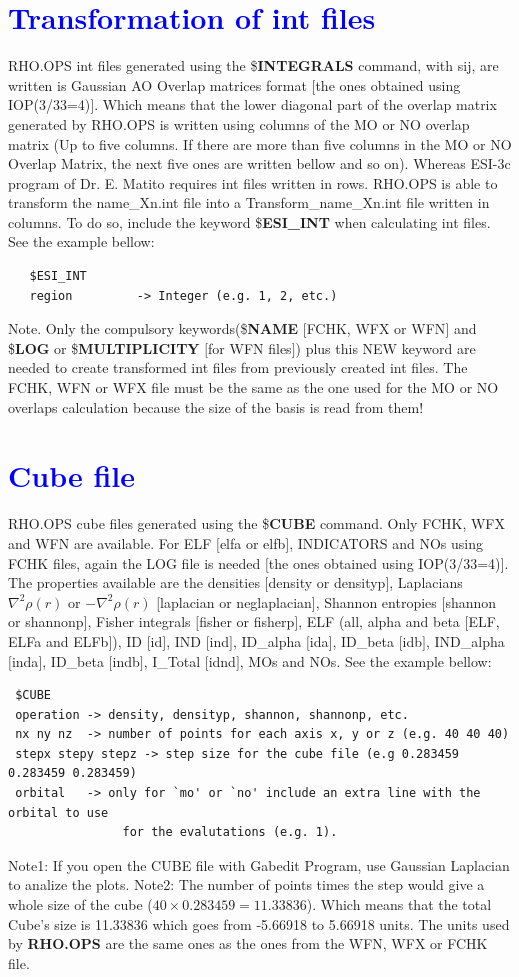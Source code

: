 \documentclass[10pt,a4paper]{article}
\newcommand{\tbl}[1]{{\textcolor{blue}{#1}}}
\begin{document}
{\section{\tbl{\textbf{Transformation of int files}}}
\noindent RHO.OPS int files generated using the \$\textbf{INTEGRALS} command, with sij, are written is Gaussian AO Overlap matrices format $[$the ones obtained using  IOP(3/33=4)$]$. Which means that the lower diagonal part of the overlap matrix generated by RHO.OPS is written using columns of the MO or NO overlap matrix (Up to five columns. If there are more than five columns in the MO or NO Overlap Matrix, the next five ones are written bellow and so on). Whereas ESI-3c program of Dr. E. Matito requires int files written in rows. RHO.OPS is able to transform the name\_Xn.int file into a Transform\_name\_Xn.int file written in columns. To do so, include the keyword \$\textbf{ESI\_INT} when calculating int files. See the example bellow:
\begin{verbatim}
   $ESI_INT
   region         -> Integer (e.g. 1, 2, etc.)
\end{verbatim}
\noindent Note. Only the compulsory keywords(\$\textbf{NAME} $[$FCHK, WFX or WFN$]$ and \$\textbf{LOG} or \$\textbf{MULTIPLICITY} $[$for WFN files$]$) plus this NEW keyword are needed to create transformed int files from previously created int files. The FCHK, WFN or WFX file must be the same as the one used for the MO or NO overlaps calculation because the size of the basis is read from them!
\section{\tbl{\textbf{Cube file}}}
\noindent RHO.OPS cube files generated using the \$\textbf{CUBE} command. Only FCHK, WFX and WFN are available. For ELF $[$elfa or elfb$]$, INDICATORS and NOs using FCHK files, again the LOG file is needed $[$the ones obtained using  IOP(3/33=4)$]$. The properties available are the densities $[$density or densityp$]$, Laplacians $\nabla ^2 \rho(r)$ or $-\nabla ^2 \rho(r)$  [laplacian or neglaplacian], Shannon entropies $[$shannon or shannonp$]$, Fisher integrals $[$fisher or fisherp$]$, ELF (all, alpha and beta $[$ELF, ELFa and ELFb$]$), ID $[$id$]$, IND $[$ind$]$, ID\_alpha $[$ida$]$, ID\_beta $[$idb$]$, IND\_alpha $[$inda$]$, ID\_beta $[$indb$]$, I\_Total $[$idnd$]$, MOs and NOs. See the example bellow:
\begin{verbatim}
 $CUBE
 operation -> density, densityp, shannon, shannonp, etc.
 nx ny nz  -> number of points for each axis x, y or z (e.g. 40 40 40)
 stepx stepy stepz -> step size for the cube file (e.g 0.283459 0.283459 0.283459)
 orbital   -> only for `mo' or `no' include an extra line with the orbital to use
                for the evalutations (e.g. 1). 
\end{verbatim}
\noindent Note1: If you open the CUBE file with Gabedit Program, use Gaussian Laplacian to analize the plots. 
\noindent Note2: The number of points times the step would give a whole size of the cube ($40\times0.283459=11.33836$). Which means that the total Cube's size is 11.33836 which goes from -5.66918 to 5.66918 units. The units used by {\bf RHO.OPS} are the same ones as the ones from the WFN, WFX or FCHK file. 
}
\end{document}
